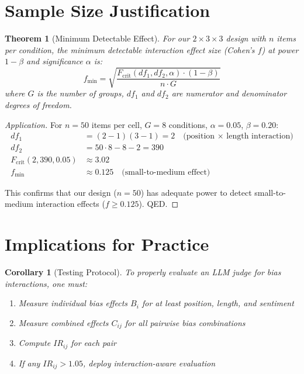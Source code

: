 \documentclass[11pt]{article}
\newtheorem{theorem}{Theorem}
\newtheorem{proof}{Proof}
\newtheorem{corollary}{Corollary}
\begin{document}
\section{Sample Size Justification}

\begin{theorem}[Minimum Detectable Effect]
For our $2 \times 3 \times 3$ design with $n$ items per condition, the minimum detectable interaction effect size (Cohen's $f$) at power $1-\beta$ and significance $\alpha$ is:
\begin{equation}
f_{\min} = \sqrt{\frac{F_{\text{crit}}(df_1, df_2, \alpha) \cdot (1-\beta)}{n \cdot G}}
\end{equation}
where $G$ is the number of groups, $df_1$ and $df_2$ are numerator and denominator degrees of freedom.
\end{theorem}

\begin{proof}[Application]
For $n = 50$ items per cell, $G = 8$ conditions, $\alpha = 0.05$, $\beta = 0.20$:
\begin{align}
df_1 &= (2-1)(3-1) = 2 \quad \text{(position × length interaction)} \\
df_2 &= 50 \cdot 8 - 8 - 2 = 390 \\
F_{\text{crit}}(2, 390, 0.05) &\approx 3.02 \\
f_{\min} &\approx 0.125 \quad \text{(small-to-medium effect)}
\end{align}

This confirms that our design ($n = 50$) has adequate power to detect small-to-medium interaction effects ($f \geq 0.125$). QED.
\end{proof}

\section{Implications for Practice}

\begin{corollary}[Testing Protocol]
To properly evaluate an LLM judge for bias interactions, one must:
\begin{enumerate}
    \item Measure individual bias effects $B_i$ for at least position, length, and sentiment
    \item Measure combined effects $C_{ij}$ for all pairwise bias combinations
    \item Compute $IR_{ij}$ for each pair
    \item If any $IR_{ij} > 1.05$, deploy interaction-aware evaluation
\end{enumerate}
\end{corollary}
\end{document}
